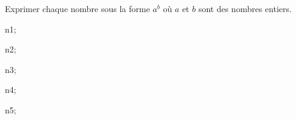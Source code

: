 \documentclass[exercice]{thedocument}%
\begin{document}
%
\begin{flushleft}
    Exprimer chaque nombre sous la forme $a^b$ où $a$ et $b$ sont des nombres
    entiers.
\end{flushleft}
\begin{enumerate}
    \begin{multicols}{2}
        \item\<n1;
        \item\<n2;
        \item\<n3;
        \item\<n4;
        \item\<n5;
    \end{multicols}
\end{enumerate}
\end{document}
